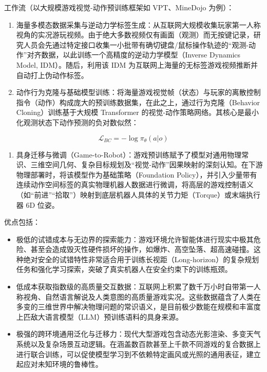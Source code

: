 工作流（以大规模游戏视觉-动作预训练框架如 VPT、MineDojo 为例）：

\begin{enumerate}
\def\labelenumi{\arabic{enumi}.}
\tightlist
\item
  海量多模态数据采集与逆动力学标签生成：从互联网大规模收集玩家第一人称视角的实况游玩视频。由于绝大多数视频仅有画面（观测）而无按键记录，研究人员会先通过特定接口收集一小批带有确切键盘/鼠标操作轨迹的``观测-动作''对齐数据，以此训练一个高精度的逆动力学模型（Inverse Dynamics Model, IDM）。随后，利用该 IDM 为互联网上海量的无标签游戏视频推断并自动打上伪动作标签。
\item
  动作行为克隆与基础模型训练：将海量游戏视觉帧（状态）与玩家的离散控制指令（动作）构成庞大的预训练数据集，在此之上，通过行为克隆（Behavior Cloning）训练基于大规模 Transformer 的视觉-动作策略网络。其核心是最小化观测状态下动作预测的负对数似然：
\end{enumerate}

\[
\mathcal{L}_{BC}=-\log\pi_\theta(a|o)
\]

\begin{enumerate}
\def\labelenumi{\arabic{enumi}.}
\setcounter{enumi}{2}
\tightlist
\item
  具身迁移与微调（Game-to-Robot）：游戏预训练赋予了模型对通用物理常识、三维空间几何、复杂目标规划及``视觉-动作''因果映射的深刻认知。在下游物理部署时，将该模型作为基础策略（Foundation Policy），并引入少量带有连续动作空间标签的真实物理机器人数据进行微调，将高层的游戏控制语义（如``前进''``拾取''）映射到底层机器人具体的关节力矩（Torque）或末端执行器 6D 位姿。
\end{enumerate}

优点包括：

\begin{itemize}
\tightlist
\item
  极低的试错成本与无边界的探索能力：游戏环境允许智能体进行现实中极其危险、甚至会造成毁灭性硬件损坏的操作，如爆炸、高空坠落、超高速碰撞。这种绝对安全的试错特性非常适合用于训练长视距（Long-horizon）的复杂规划任务和强化学习探索，突破了真实机器人在安全约束下的训练瓶颈。
\item
  低成本获取指数级的高质量交互数据：互联网上积累了数千万小时自带第一人称视角、自然语言解说及人类意图的高质量游戏实况。这些数据蕴含了人类在多变的三维世界中解决物理问题的常识语义，是目前极少数能在规模和丰富度上匹敌大语言模型（LLM）预训练语料的具身来源。
\item
  极强的跨环境通用泛化与迁移力：现代大型游戏包含动态光影渲染、多变天气系统以及复杂场景互动逻辑。在涵盖数百款甚至上千款不同游戏的复合数据上进行联合训练，可以促使模型学习到不依赖特定画风或光照的通用表征，建立起应对未知环境的鲁棒性。
\end{itemize}

